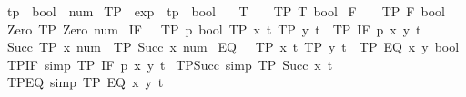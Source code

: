 \begin{isabellebody}
\isanewline
{}\isamarkupfalse%
\ tp\ {\isacharequal}{\kern0pt}\ bool\ {\isacharbar}{\kern0pt}\ num\isanewline
\isanewline
{}\isamarkupfalse%
\ TP\ {\isacharcolon}{\kern0pt}{\isacharcolon}{\kern0pt}\ {\isachardoublequoteopen}exp\ {\isasymRightarrow}\ tp\ {\isasymRightarrow}\ bool{\isachardoublequoteclose}\ \isanewline
\ \ T{\isacharcolon}{\kern0pt}\ \ \ \ {\isachardoublequoteopen}TP\ T\ bool{\isachardoublequoteclose}\isanewline
{\isacharbar}{\kern0pt}\ F{\isacharcolon}{\kern0pt}\ \ \ \ {\isachardoublequoteopen}TP\ F\ bool{\isachardoublequoteclose}\isanewline
{\isacharbar}{\kern0pt}\ Zero{\isacharcolon}{\kern0pt}\ {\isachardoublequoteopen}TP\ Zero\ num{\isachardoublequoteclose}\isanewline
{\isacharbar}{\kern0pt}\ IF{\isacharcolon}{\kern0pt}\ \ \ {\isachardoublequoteopen}{\isasymlbrakk}TP\ p\ bool{\isacharsemicolon}{\kern0pt}\ TP\ x\ t{\isacharsemicolon}{\kern0pt}\ TP\ y\ t{\isasymrbrakk}\ {\isasymLongrightarrow}\ TP\ {\isacharparenleft}{\kern0pt}IF\ p\ x\ y{\isacharparenright}{\kern0pt}\ t{\isachardoublequoteclose}\isanewline
{\isacharbar}{\kern0pt}\ Succ{\isacharcolon}{\kern0pt}\ {\isachardoublequoteopen}TP\ x\ num\ {\isasymLongrightarrow}\ TP\ {\isacharparenleft}{\kern0pt}Succ\ x{\isacharparenright}{\kern0pt}\ num{\isachardoublequoteclose}\isanewline
{\isacharbar}{\kern0pt}\ EQ{\isacharcolon}{\kern0pt}\ \ \ {\isachardoublequoteopen}{\isasymlbrakk}TP\ x\ t{\isacharsemicolon}{\kern0pt}\ TP\ y\ t{\isasymrbrakk}\ {\isasymLongrightarrow}\ TP\ {\isacharparenleft}{\kern0pt}EQ\ x\ y{\isacharparenright}{\kern0pt}\ bool{\isachardoublequoteclose}\isanewline
\isanewline
{}\isamarkupfalse%
\ TP{\isacharunderscore}{\kern0pt}IF\ {\isacharbrackleft}{\kern0pt}simp{\isacharbrackright}{\kern0pt}{\isacharcolon}{\kern0pt}\ {\isachardoublequoteopen}TP\ {\isacharparenleft}{\kern0pt}IF\ p\ x\ y{\isacharparenright}{\kern0pt}\ t{\isachardoublequoteclose}\isanewline
{}\isamarkupfalse%
\ TP{\isacharunderscore}{\kern0pt}Succ\ {\isacharbrackleft}{\kern0pt}simp{\isacharbrackright}{\kern0pt}{\isacharcolon}{\kern0pt}\ {\isachardoublequoteopen}TP\ {\isacharparenleft}{\kern0pt}Succ\ x{\isacharparenright}{\kern0pt}\ t{\isachardoublequoteclose}\isanewline
{}\isamarkupfalse%
\ TP{\isacharunderscore}{\kern0pt}EQ\ {\isacharbrackleft}{\kern0pt}simp{\isacharbrackright}{\kern0pt}{\isacharcolon}{\kern0pt}\ {\isachardoublequoteopen}TP\ {\isacharparenleft}{\kern0pt}EQ\ x\ y{\isacharparenright}{\kern0pt}\ t{\isachardoublequoteclose}\isanewline

\end{isabellebody}
